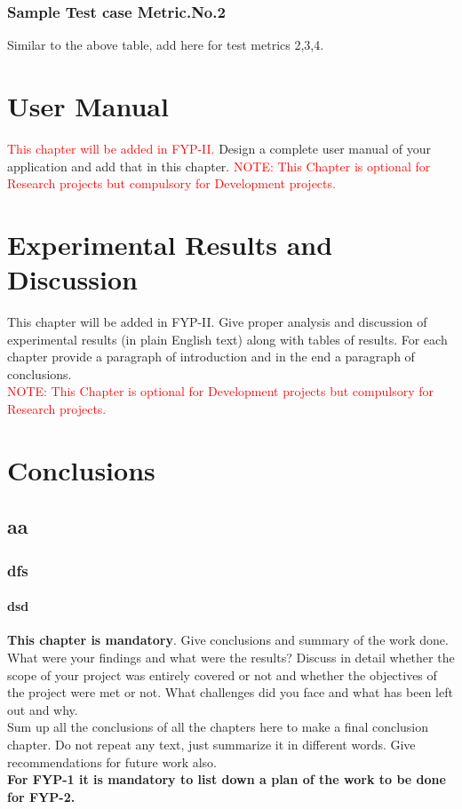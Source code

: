 \documentclass{FastFyp}
\begin{document}
\subsection{Sample Test case Metric.No.2}
Similar to the above table, add here for test metrics 2,3,4.\\
\chapter{User Manual}
\textcolor{red}{This chapter will be added in FYP-II.} Design a complete user manual of your application and add that in this chapter.
\textcolor{red}{NOTE: This Chapter is optional for Research projects but compulsory for Development projects.}\\
\chapter{Experimental Results and Discussion}
This chapter will be added in FYP-II. Give proper analysis and discussion of experimental results (in plain English text) along with tables of results.  For each chapter provide a paragraph of introduction and in the end a paragraph of conclusions.\\
\textcolor{red}{NOTE: This Chapter is optional for Development projects but compulsory for Research projects.}

\chapter{Conclusions}
\section{aa}
\subsection{dfs}
\subsubsection{dsd}
{\bf This chapter is mandatory}.  
Give conclusions and summary of the work done.  What were your findings and what were the results?  Discuss in detail whether the scope of your project was entirely covered or not and whether the objectives of the project were met or not.  What challenges did you face and what has been left out and why.\\
Sum up all the conclusions of all the chapters here to make a final conclusion chapter.  Do not repeat any text, just summarize it in different words. Give recommendations for future work also.\\
\textbf{For FYP-1 it is mandatory to list down a plan of the work to be done for FYP-2.}
\end{document}
